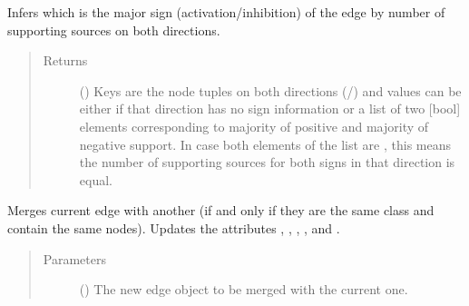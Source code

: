 \documentclass[letterpaper,10pt,english]{sphinxmanual}
\begin{document}
\begin{fulllineitems}
\begin{fulllineitems}
\begin{quote}
\begin{description}
\end{description}\end{quote}

\end{fulllineitems}


\begin{fulllineitems}
\label{\detokenize{reference:pypath.main.Direction.majority_sign}}
Infers which is the major sign (activation/inhibition) of the
edge by number of supporting sources on both directions.
\begin{quote}\begin{description}
\item[{Returns}] \leavevmode
() \textendash{} Keys are the node tuples on both directions
(/) and values can be
either  if that direction has no sign information or
a list of two {[}bool{]} elements corresponding to majority of
positive and majority of negative support. In case both
elements of the list are , this means the number of
supporting sources for both signs in that direction is
equal.

\end{description}\end{quote}

\end{fulllineitems}


\begin{fulllineitems}
\label{\detokenize{reference:pypath.main.Direction.merge}}
Merges current edge with another (if and only if they are the
same class and contain the same nodes). Updates the attributes
, , ,
,  and
.
\begin{quote}\begin{description}
\item[{Parameters}] \leavevmode
{} ({\hyperref[\detokenize{reference:pypath.main.Direction}]{}}) \textendash{} The new edge object to be merged with the current one.


\end{description}
\end{quote}
\end{fulllineitems}
\end{fulllineitems}
\end{document}
